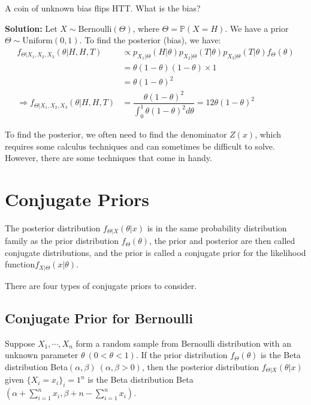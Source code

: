 \newpage
\begin{eg}
  A coin of unknown bias flips HTT. What is the bias?

  \textbf{Solution:} 
  Let \(X \sim \text{Bernoulli}(\Theta)\), where \(\Theta = \mathbb{P}(X = H)\). We have a prior \(\Theta \sim \text{Uniform}(0, 1)\). To find the posterior (bias), we have:
  \[
    \begin{aligned}
      f_{\Theta \vert X_1, X_2, X_3} (\theta \vert H,H,T) &\propto p_{X_1 \vert \Theta} (H \vert \theta) p_{X_2 \vert \Theta} (T \vert \theta) p_{X_3 \vert \Theta} (T \vert \theta) f_{\Theta} (\theta) \\
      &= \theta (1 - \theta) (1 - \theta) \times 1 \\
      &= \theta (1 - \theta)^2 \\
      \Longrightarrow f_{\Theta \vert X_1, X_2, X_3} (\theta \vert H,H,T) &= \dfrac{\theta (1 - \theta)^2}{\int_0 ^1 \theta  (1 - \theta)^2 d \theta} = 12\theta (1 - \theta)^2
    \end{aligned}
  \]
\end{eg}

To find the posterior, we often need to find the denominator \(Z(x)\), which requires some calculus techniques and can sometimes be difficult to solve. However, there are some techniques that come in handy.

\section{Conjugate Priors}

\begin{definition}
  The posterior distribution \(f_{\Theta \vert X} (\theta \vert x)\) is in the same probability distribution family as the prior distribution \(f_{\Theta} (\theta)\), the prior and posterior are then called conjugate distributions, and the prior is called a conjugate prior for
  the likelihood function\(f_{X \vert \Theta} (x \vert \theta)\).
\end{definition}

There are four types of conjugate priors to consider. 

\subsection{Conjugate Prior for Bernoulli}
\begin{definition}
  Suppose \(X_1, \cdots, X_n\) form a random sample from Bernoulli distribution with an unknown parameter \(\theta\ (0 < \theta < 1)\). If the prior distribution \(f_{\Theta}(\theta)\) is the Beta distribution Beta\((\alpha, \beta)\ (\alpha, \beta > 0)\), then the posterior distribution \(f_{\Theta \vert X}(\theta \vert x)\) given \(\{X_i = x_i\}_i=1^n\) is the Beta distribution Beta\((\alpha + \sum_{i = 1}^n x_i, \beta + n - \sum_{i = 1}^n x_i)\). 
\end{definition}

